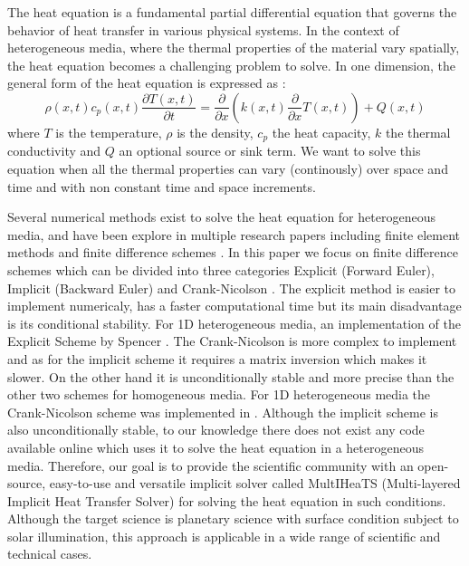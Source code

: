 \documentclass[]{interact}
\theoremstyle{plain}%
\theoremstyle{definition}
\theoremstyle{remark}
\begin{document}
The heat equation is a fundamental partial differential equation that governs the behavior of heat transfer in various physical systems. In the context of heterogeneous media, where the thermal properties of the material vary spatially, the heat equation becomes a challenging problem to solve.  In one dimension, the general form of the heat equation is expressed as :
\begin{equation}
    \rho(x, t) c_p(x, t) \dfrac{\partial T(x, t)}{\partial t} =  \dfrac{\partial}{\partial x} \left( k(x, t) \dfrac{\partial}{\partial x} T(x, t) \right)
    +  Q(x, t)
\end{equation}
where $T$ is the temperature, $\rho$ is the density, $c_p$ the heat capacity, $k$ the thermal conductivity and $Q$ an optional source or sink term.
We want to solve this equation when all the thermal properties can vary (continously) over space and time and with non constant time and space increments. 

Several numerical methods exist to solve the heat equation for heterogeneous media, and have been explore in multiple research papers including finite element methods \cite{citer} and finite difference schemes \cite{citer}.
In this paper we focus on finite difference schemes which can be divided into three categories Explicit (Forward Euler), Implicit (Backward Euler) and Crank-Nicolson \cite{Crank1947}.
 The explicit method is easier to implement numericaly, has a faster computational time but its main disadvantage is its conditional stability. For 1D heterogeneous media, an implementation of the Explicit Scheme by Spencer \cite{Spencer1989}. 
The Crank-Nicolson is more complex to implement and as for the implicit scheme it requires a matrix inversion which makes it slower. On the other hand it is unconditionally stable and more precise than the other two schemes for homogeneous media. 
For 1D heterogeneous media  the Crank-Nicolson scheme was implemented in \cite{Schorghofer2010}.
Although the implicit scheme is also unconditionally stable, to our knowledge there does not exist any code available online which uses it to solve the heat equation in a heterogeneous media.
Therefore, our goal is to provide the scientific community with an open-source, easy-to-use and versatile implicit solver called MultIHeaTS (Multi-layered Implicit Heat Transfer Solver) for solving the heat equation in such conditions.
Although the target science is planetary science with surface condition subject to solar illumination, this approach is applicable in a wide range of scientific and technical cases.
\end{document}
